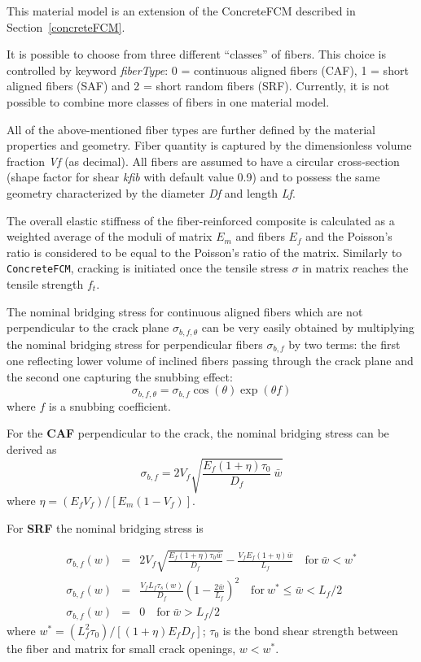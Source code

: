 \documentclass[a4paper]{article}
\newcommand{\param}[1]{{\it #1}}
\begin{document}
This material model is an extension of the ConcreteFCM described in Section~\ref{concreteFCM}.

It is possible to choose from three different ``classes'' of fibers. This choice is controlled by keyword \param{fiberType}: 0 = continuous aligned fibers (CAF), 1 = short aligned fibers (SAF) and 2 = short random fibers (SRF). Currently, it is not possible to combine more classes of fibers in one material model.

All of the above-mentioned fiber types are further defined by the material properties and geometry. Fiber quantity is captured by the dimensionless volume fraction \param{Vf} (as decimal). All fibers are assumed to have a circular cross-section (shape factor for shear \param{kfib} with default value 0.9) and to possess the same geometry characterized by the diameter \param{Df} and length \param{Lf}.

The overall elastic stiffness of the fiber-reinforced composite is calculated as a weighted average of the moduli of matrix $E_m$ and fibers $E_f$ and the Poisson's ratio is considered to be equal to the Poisson's ratio of the matrix. Similarly to \texttt{ConcreteFCM}, cracking is initiated once the tensile stress $\sigma$ in matrix reaches the tensile strength $f_t$.

The nominal bridging stress for continuous aligned fibers which are not perpendicular to the crack plane $\sigma_{b,f,\theta}$ can be very easily obtained by multiplying the nominal bridging stress for perpendicular fibers $\sigma_{b,f}$ by two terms: the first one reflecting lower volume of inclined fibers passing through the crack plane and the second one capturing the snubbing effect:
%
\begin{equation}
\sigma_{b,f,\theta} = \sigma_{b,f} \cos(\theta) \exp(\theta f)
\end{equation}
%
where $f$ is a snubbing coefficient.

For the \textbf{CAF} perpendicular to the crack, the nominal bridging stress can be derived as
%
\begin{equation}
  \sigma_{b,f} = 2 V_f \sqrt{ \frac{ E_f (1+\eta) \tau_0 } {D_f} \: \bar{w} }
\end{equation}
%
where $\eta = (E_f V_f)/[E_m (1 - V_f)]$.

For \textbf{SRF} the nominal bridging stress is 

\begin{eqnarray}
\sigma_{b,f}(w) &=& 2 V_f \sqrt{ \frac{E_f (1+\eta) \tau_0 \bar{w}}{D_f} } - \frac{V_f E_f (1+\eta) \bar{w} }{L_f}  \quad \mathrm{for} \: \bar{w} < w^* \\
\sigma_{b,f}(w) &=& \frac{V_f L_f \tau_s(w)}{D_f} \left( 1- \frac{2 \bar{w}}{L_f} \right)^2 \quad \mathrm{for} \: w^* \leq \bar{w} < L_f/2 \\
\sigma_{b,f}(w) &=& 0 \quad \mathrm{for} \: \bar{w} > L_f/2 
\end{eqnarray}
where $w^* = \left(L_f^2 \tau_0 \right)/[(1+\eta) E_f D_f]$; $\tau_0$ is the bond shear strength between the fiber and matrix for small crack openings, $w<w^\ast$.
\end{document}
